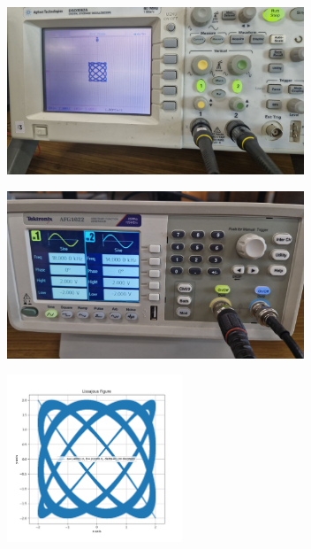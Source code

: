 \documentclass[a4paper,12pt]{article}
\begin{document}
\begin{figure}[H]
    \centering
    \begin{subfigure}{\textwidth}
        \centering
        \includegraphics[height=5cm]{figures/5/plot.jpg}
    \end{subfigure}%
    \begin{subfigure}{\textwidth}
        \centering
        \includegraphics[height=5cm]{figures/5/para.jpg}
    \end{subfigure}
    \begin{subfigure}{\textwidth}
        \centering
        \includegraphics[height=5cm]{figures/5/Figure_5.png}
    \end{subfigure}%
\end{figure}
\end{document}
